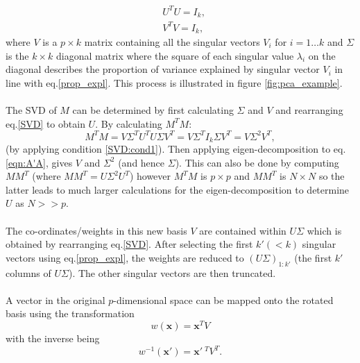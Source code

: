 \documentclass{article}
\newcommand{\numInputs}{p}
\newcommand{\inputVec}{\mathbf{x}}
\newcommand{\numSamples}{N}
\newcommand{\LSingVecs}{U}
\newcommand{\RSingVecs}{V}
\newcommand{\basis}{V}
\newcommand{\singValMat}{\Sigma}
\newcommand{\singVal}{\lambda}
\newcommand{\matRank}{k}
\newcommand{\sampleMat}{M}
\begin{document}
\begin{align}
    & \LSingVecs^T \LSingVecs = I_\matRank \label{SVD:cond1}, \\
    & \RSingVecs^T \RSingVecs = I_\matRank \label{SVD:cond2},
\end{align}
where $\RSingVecs$ is a $\numInputs \times \matRank$ matrix containing all the singular vectors $\RSingVecs_i$ for $i=1\dots \matRank$ and $\singValMat$ is the $\matRank \times \matRank$ diagonal matrix where the square of each singular value $\singVal_i$ on the diagonal describes the proportion of variance explained by singular vector $\RSingVecs_i$ in line with eq.\eqref{prop_expl}. This process is illustrated in figure \ref{fig:pca_example}.\\\\
The SVD of $\sampleMat$ can be determined by first calculating $\singValMat$ and $\RSingVecs$ and rearranging eq.\eqref{SVD} to obtain $\LSingVecs$. By calculating $\sampleMat^T\sampleMat$:
\begin{equation}
\label{eqn:A'A}
    \sampleMat^T \sampleMat = \RSingVecs \singValMat^T \LSingVecs^T \LSingVecs \singValMat \RSingVecs^T = \RSingVecs\singValMat^T I_k \singValMat \RSingVecs^T =  \RSingVecs \singValMat^2 \RSingVecs^T,
\end{equation}
(by applying condition \eqref{SVD:cond1}). Then applying eigen-decomposition to eq.\eqref{eqn:A'A}, gives $\RSingVecs$ and $\singValMat^2$ (and hence $\singValMat$). This can also be done by computing $\sampleMat \sampleMat^T$ (where $\sampleMat \sampleMat^T = \LSingVecs\singValMat^2 \LSingVecs^T$) however $\sampleMat^T \sampleMat$ is $\numInputs\times \numInputs$ and $\sampleMat \sampleMat^T$ is $\numSamples \times \numSamples$ so the latter leads to much larger calculations for the eigen-decomposition to determine $\LSingVecs$ as $\numSamples>>\numInputs$.\\\\
The co-ordinates/weights in this new basis $V$ are contained within $\LSingVecs\singValMat$ which is obtained by rearranging eq.\eqref{SVD}. After selecting the first $\matRank'(<\matRank)$ singular vectors using eq.\eqref{prop_expl}, the weights are reduced to $(\LSingVecs\singValMat)_{1:\matRank'}$ (the first $\matRank'$ columns of $\LSingVecs\singValMat$). The other singular vectors are then truncated.\\\\
A vector in the original $p$-dimensional space can be mapped onto the rotated basis using the transformation \[w(\inputVec) = \inputVec^T \basis \] with the inverse being \[w^{-1}(\inputVec') = \inputVec'\ ^T \RSingVecs^T.\]
\end{document}
